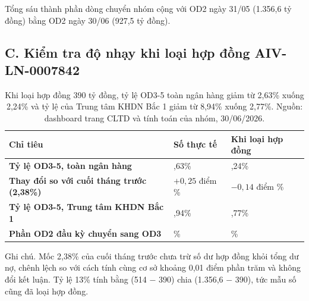 \documentclass[12pt]{eDA_conquer2026}
\begin{document}
\begin{appendices}
Tổng sáu thành phần dòng chuyển nhóm cộng với OD2 ngày 31/05 (1.356,6 tỷ đồng) bằng OD2 ngày 30/06 (927,5 tỷ đồng).

\subsection*{C. Kiểm tra độ nhạy khi loại hợp đồng AIV-LN-0007842}

\begin{table}[H]
\centering
\caption{Khi loại hợp đồng 390 tỷ đồng, tỷ lệ OD3-5 toàn ngân hàng giảm từ 2,63\% xuống 2,24\% và tỷ lệ của Trung tâm KHDN Bắc 1 giảm từ 8,94\% xuống 2,77\%. Nguồn: dashboard trang CLTD và tính toán của nhóm, 30/06/2026.}
\vspace{0.15cm}
\renewcommand{\arraystretch}{1.6}
\begin{tabularx}{0.95\linewidth}{@{}
    >{\raggedright\arraybackslash\bfseries}X
    >{\centering\arraybackslash}p{3cm}
    >{\centering\arraybackslash}p{3.6cm} @{}}
  \toprule
  \textbf{Chỉ tiêu} & \textbf{Số thực tế} & \textbf{Khi loại hợp đồng} \\
  \midrule
  Tỷ lệ OD3-5, toàn ngân hàng & 2,63\% & 2,24\% \\
  Thay đổi so với cuối tháng trước (2,38\%) & $+0{,}25$ điểm \% & $-0{,}14$ điểm \% \\
  Tỷ lệ OD3-5, Trung tâm KHDN Bắc 1 & 8,94\% & 2,77\% \\
  Phần OD2 đầu kỳ chuyển sang OD3 & 38\% & 13\% \\
  \bottomrule
\end{tabularx}
\end{table}

Ghi chú. Mốc 2,38\% của cuối tháng trước chưa trừ số dư hợp đồng khỏi tổng dư nợ, chênh lệch so với cách tính cùng cơ sở khoảng 0,01 điểm phần trăm và không đổi kết luận. Tỷ lệ 13\% tính bằng (514 $-$ 390) chia (1.356,6 $-$ 390), tức mẫu số cũng đã loại hợp đồng.

\end{appendices}
\end{document}
